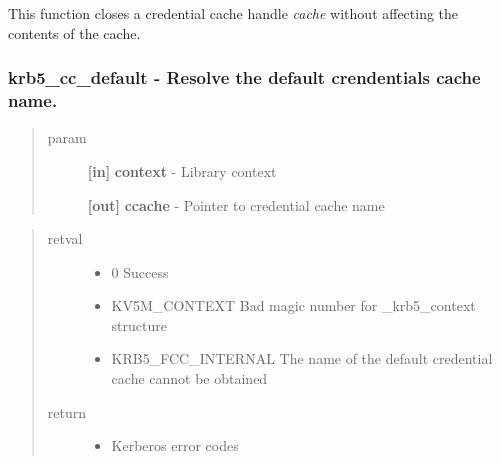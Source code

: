 \documentclass[letterpaper,10pt,english]{sphinxmanual}
\begin{document}
This function closes a credential cache handle \emph{cache} without affecting the contents of the cache.


\subsubsection{krb5\_cc\_default -  Resolve the default crendentials cache name.}
\label{appdev/refs/api/krb5_cc_default::doc}\label{appdev/refs/api/krb5_cc_default:krb5-cc-default-resolve-the-default-crendentials-cache-name}

\begin{fulllineitems}
\label{appdev/refs/api/krb5_cc_default:krb5_cc_default}
\end{fulllineitems}

\begin{quote}\begin{description}
\item[{param}] \leavevmode
\textbf{{[}in{]}} \textbf{context} - Library context

\textbf{{[}out{]}} \textbf{ccache} - Pointer to credential cache name

\end{description}\end{quote}
\begin{quote}\begin{description}
\item[{retval}] \leavevmode\begin{itemize}
\item {} 
0   Success

\item {} 
KV5M\_CONTEXT   Bad magic number for \_krb5\_context structure

\item {} 
KRB5\_FCC\_INTERNAL   The name of the default credential cache cannot be obtained

\end{itemize}

\item[{return}] \leavevmode\begin{itemize}
\item {} 
Kerberos error codes

\end{itemize}

\end{description}\end{quote}
\end{document}
